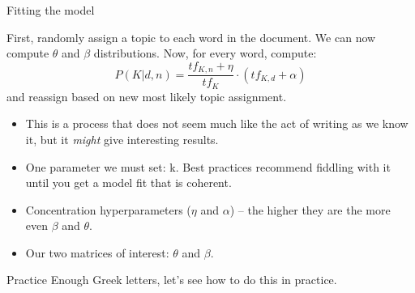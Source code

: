 \documentclass[t]{beamer}
\begin{document}
\begin{frame}{Fitting the model}

First, randomly assign a topic to each word in the document. We can now compute $\theta$ and $\beta$ distributions. Now, for every word, compute:
$$ P(K|d,n) = \frac{tf_{K,n} + \eta}{tf_K} \cdot (tf_{K,d} + \alpha)$$
and reassign based on new most likely topic assignment.

\begin{itemize}[<+->]
    \item This is a process that does not seem much like the act of writing as we know it, but it \textit{might} give interesting results.
    \item One parameter we must set: k. Best practices recommend fiddling with it until you get a model fit that is coherent.
    \item Concentration hyperparameters ($\eta$ and $\alpha$) -- the higher they are the more even $\beta$ and $\theta$. 
    \item Our two matrices of interest: $\theta$ and $\beta$.
\end{itemize}
\end{frame}

\begin{frame}{Practice}
\vspace*{\fill}
\centering Enough Greek letters, let's see how to do this in practice.
\vspace*{\fill}
\end{frame}
\end{document}

